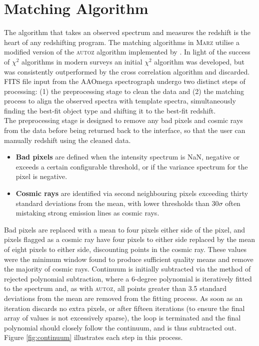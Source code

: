 \documentclass[iop]{emulateapj}
\newcommand{\autoz}{\textsc{autoz}}
\newcommand{\marz}{\textsc{Marz}}
\begin{document}
\section{Matching Algorithm}

The algorithm that takes an observed spectrum and measures the redshift is the heart of any redshifting program. The matching algorithms in \marz{} utilise a modified version of the \autoz{} algorithm implemented by \citet{baldry2014galaxy}. In light of the success of $\chi^2$ algorithms in modern surveys \citep{bolton2012} an initial $\chi^2$ algorithm was developed, but was consistently outperformed by the cross correlation algorithm and discarded. FITS file input from the AAOmega spectrograph undergo two distinct steps of processing: (1) the preprocessing stage to clean the data and (2) the matching process to align the observed spectra with template spectra, simultaneously finding the best-fit object type and shifting it to the best-fit redshift.\\

The preprocessing stage is designed to remove any bad pixels and cosmic rays from the data before being returned back to the interface, so that the user can manually redshift using the cleaned data.
\begin{itemize}
\item \textbf{Bad pixels} are defined when the intensity spectrum is NaN, negative or exceeds a certain configurable threshold, or if the variance spectrum for the pixel is negative.
\item \textbf{Cosmic rays} are identified via second neighbouring pixels exceeding thirty standard deviations from the mean, with lower thresholds than $30\sigma$ often mistaking strong emission lines as cosmic rays. 
\end{itemize}
Bad pixels are replaced with a mean to four pixels either side of the pixel, and pixels flagged as a cosmic ray have four pixels to either side replaced by the mean of eight pixels to either side, discounting points in the cosmic ray. These values were the minimum window found to produce sufficient quality means and remove the majority of cosmic rays. Continuum is initially subtracted via the method of rejected polynomial subtraction, where a 6-degree polynomial is iteratively fitted to the spectrum and, as with \autoz{}, all points greater than 3.5 standard deviations from the mean are removed from the fitting process. As soon as an iteration discards no extra pixels, or after fifteen iterations (to ensure the final array of values is not excessively sparse), the loop is terminated and the final polynomial should closely follow the continuum, and is thus subtracted out. Figure \ref{fig:continuum} illustrates each step in this process.\\
\end{document}

